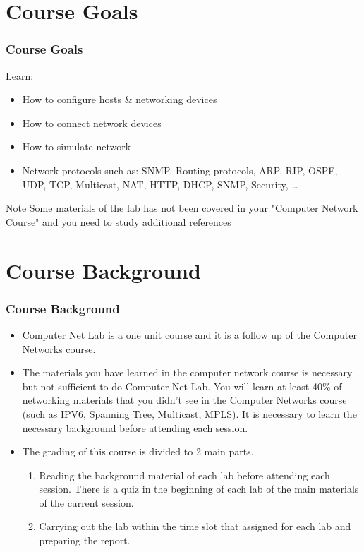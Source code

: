 \documentclass[aspectratio=169,15pt]{beamer}
\begin{document}
\section{Course Goals}
\begin{frame}
    \frametitle{Course Goals}

    Learn:
    \begin{itemize}
        \item How to configure hosts \& networking devices
        \item How to connect network devices
        \item How to simulate network
        \item Network protocols such as: SNMP, Routing protocols, ARP, RIP, OSPF, UDP, TCP, Multicast, NAT, HTTP, DHCP, SNMP, Security, \dots
    \end{itemize}

    \begin{alertblock}{Note}
        Some materials of the lab has not been covered in your "Computer Network Course" and you need to study additional references
    \end{alertblock}

\end{frame}

\section{Course Background}
\begin{frame}
    \frametitle{Course Background}

    \begin{itemize}
        \item Computer Net Lab is a one unit course and it is a follow up of the Computer Networks course.
        \item The materials you have learned in the computer network course is necessary but not sufficient to do Computer Net Lab.
              You will learn at least 40\% of networking materials that you didn’t see in the Computer Networks course (such as IPV6, Spanning Tree, Multicast, MPLS).
              It is necessary to learn the necessary background before attending each session.
        \item The grading of this course is divided to 2 main parts.
              \begin{enumerate}
                  \item Reading the background material of each lab before attending each session.
                        There is a quiz in the beginning of each lab of the main materials of the current session.
                  \item Carrying out the lab within the time slot that assigned for each lab and preparing the report.
              \end{enumerate}
    \end{itemize}

\end{frame}
\end{document}
